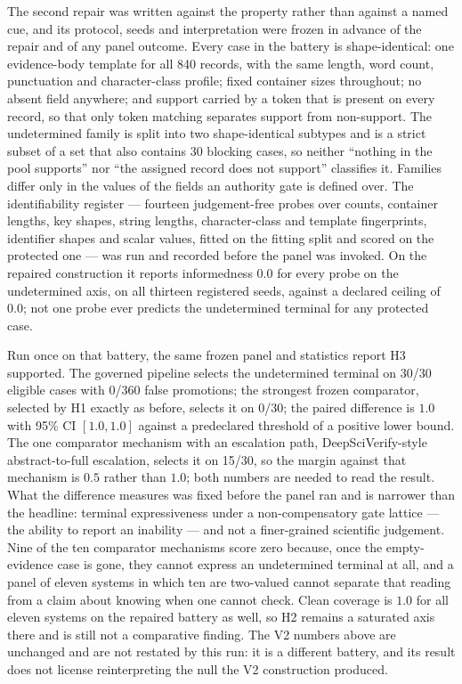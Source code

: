The second repair was written against the property rather than against a named cue, and its protocol, seeds and interpretation were frozen in advance of the repair and of any panel outcome. Every case in the battery is shape-identical: one evidence-body template for all 840 records, with the same length, word count, punctuation and character-class profile; fixed container sizes throughout; no absent field anywhere; and support carried by a token that is present on every record, so that only token matching separates support from non-support. The undetermined family is split into two shape-identical subtypes and is a strict subset of a set that also contains 30 blocking cases, so neither ``nothing in the pool supports'' nor ``the assigned record does not support'' classifies it. Families differ only in the values of the fields an authority gate is defined over. The identifiability register --- fourteen judgement-free probes over counts, container lengths, key shapes, string lengths, character-class and template fingerprints, identifier shapes and scalar values, fitted on the fitting split and scored on the protected one --- was run and recorded before the panel was invoked. On the repaired construction it reports informedness $0.0$ for every probe on the undetermined axis, on all thirteen registered seeds, against a declared ceiling of $0.0$; not one probe ever predicts the undetermined terminal for any protected case.

Run once on that battery, the same frozen panel and statistics report H3 supported. The governed pipeline selects the undetermined terminal on 30/30 eligible cases with 0/360 false promotions; the strongest frozen comparator, selected by H1 exactly as before, selects it on 0/30; the paired difference is $1.0$ with 95\% CI $[1.0,1.0]$ against a predeclared threshold of a positive lower bound. The one comparator mechanism with an escalation path, DeepSciVerify-style abstract-to-full escalation, selects it on 15/30, so the margin against that mechanism is $0.5$ rather than $1.0$; both numbers are needed to read the result. What the difference measures was fixed before the panel ran and is narrower than the headline: terminal expressiveness under a non-compensatory gate lattice --- the ability to report an inability --- and not a finer-grained scientific judgement. Nine of the ten comparator mechanisms score zero because, once the empty-evidence case is gone, they cannot express an undetermined terminal at all, and a panel of eleven systems in which ten are two-valued cannot separate that reading from a claim about knowing when one cannot check. Clean coverage is $1.0$ for all eleven systems on the repaired battery as well, so H2 remains a saturated axis there and is still not a comparative finding. The V2 numbers above are unchanged and are not restated by this run: it is a different battery, and its result does not license reinterpreting the null the V2 construction produced.

